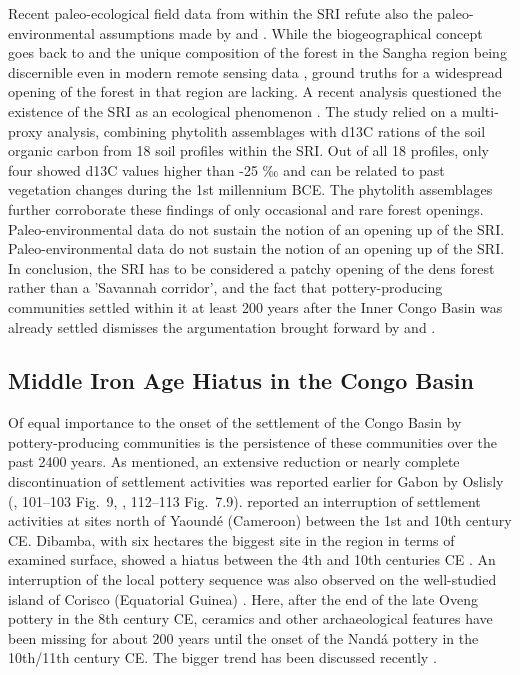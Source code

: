 \documentclass[smallextended,natbib]{svjour3}       %
\begin{document}
Recent paleo-ecological field data from within the SRI \citep{Bremond.2017} refute also the paleo-environmental assumptions made by \cite{Grollemund.2015} and \cite{Bostoen.2015}. While the biogeographical concept goes back to \cite{Letouzey.1968} and the unique composition of the forest in the Sangha region being discernible even in modern remote sensing data \citep{Gond.2013,Philippon.2019}, ground truths for a widespread opening of the forest in that region are lacking. A recent analysis questioned the existence of the SRI as an ecological phenomenon \citep{Bremond.2017}. The study relied on a multi-proxy analysis, combining phytolith assemblages with d13C rations of the soil organic carbon from 18 soil profiles within the SRI. Out of all 18 profiles, only four showed d13C values higher than -25 ‰ and can be related to past vegetation changes during the 1st millennium BCE. The phytolith assemblages \citep[99]{Bremond.2017} further corroborate these findings of only occasional and rare forest openings. Paleo-environmental data do not sustain the notion of an opening up of the SRI. Paleo-environmental data do not sustain the notion of an opening up of the SRI. In conclusion, the SRI has to be considered a patchy opening of the dens forest rather than a 'Savannah corridor', and the fact that pottery-producing communities settled within it at least 200 years after the Inner Congo Basin was already settled dismisses the argumentation brought forward by \cite{Grollemund.2015} and \cite{Bostoen.2015}.

\subsection*{Middle Iron Age Hiatus in the Congo Basin}

Of equal importance to the onset of the settlement of the Congo Basin by pottery-producing communities is the persistence of these communities over the past 2400 years. As mentioned, an extensive reduction or nearly complete discontinuation of settlement activities was reported earlier for Gabon by Oslisly (\citeyear{Oslisly.1998}, 101--103 Fig.~9, \citeyear{Oslisly.2001d}, 112--113 Fig.~7.9). \cite{Leka.2008} reported an interruption of settlement activities at sites north of Yaoundé (Cameroon) between the 1st and 10th century CE. Dibamba, with six hectares the biggest site in the region in terms of examined surface, showed a hiatus between the 4th and 10th centuries CE \citep{Saulieu.2017}. An interruption of the local pottery sequence was also observed on the well-studied island of Corisco (Equatorial Guinea) \citep[355--356]{SanchezElipe.2016}. Here, after the end of the late Oveng pottery in the 8th century CE, ceramics and other archaeological features have been missing for about 200 years until the onset of the Nandá pottery in the 10th/11th century CE. The bigger trend has been discussed recently \citep{deSaulieu.2021a,Seidensticker.2021}.
\end{document}
